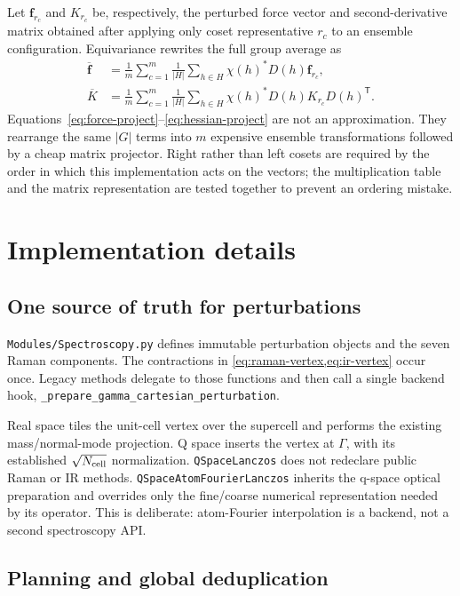 \documentclass[11pt,a4paper]{article}
\begin{document}
Let $\bm f_{r_c}$ and $K_{r_c}$ be, respectively, the perturbed force vector
and second-derivative matrix obtained after applying only coset representative
$r_c$ to an ensemble configuration.  Equivariance rewrites the full group
average as
\begin{align}
  \overline{\bm f}
  &=\frac1m\sum_{c=1}^{m}\frac1{|H|}
    \sum_{h\in H}\chi(h)^*D(h)\bm f_{r_c},
  \label{eq:force-project}\\
  \overline K
  &=\frac1m\sum_{c=1}^{m}\frac1{|H|}
    \sum_{h\in H}\chi(h)^*D(h)K_{r_c}D(h)^{\mathsf T}.
  \label{eq:hessian-project}
\end{align}
Equations~\eqref{eq:force-project}--\eqref{eq:hessian-project} are not an
approximation.  They rearrange the same $|G|$ terms into $m$ expensive
ensemble transformations followed by a cheap matrix projector.  Right rather
than left cosets are required by the order in which this implementation acts
on the vectors; the multiplication table and the matrix representation are
tested together to prevent an ordering mistake.

\section{Implementation details}
\label{sec:implementation}

\subsection{One source of truth for perturbations}

\texttt{Modules/Spectroscopy.py} defines immutable perturbation objects and
the seven Raman components.  The contractions in
\cref{eq:raman-vertex,eq:ir-vertex} occur once.  Legacy methods delegate to
those functions and then call a single backend hook,
\texttt{\_prepare\_gamma\_cartesian\_perturbation}.

Real space tiles the unit-cell vertex over the supercell and performs the
existing mass/normal-mode projection.  Q space inserts the vertex at
$\Gamma$, with its established $\sqrt{N_{\rm cell}}$ normalization.
\texttt{QSpaceLanczos} does not redeclare public Raman or IR methods.
\texttt{QSpaceAtomFourierLanczos} inherits the q-space optical preparation and
overrides only the fine/coarse numerical representation needed by its
operator.  This is deliberate: atom-Fourier interpolation is a backend, not a
second spectroscopy API.

\subsection{Planning and global deduplication}
\end{document}

